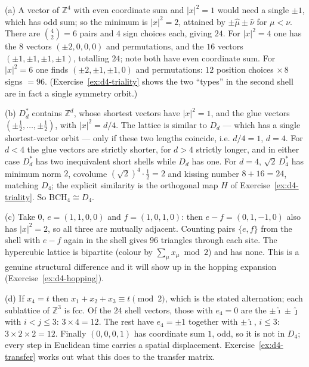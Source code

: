 {(a) A vector of $\mathbb{Z}^4$ with even coordinate sum and $|x|^2=1$ would need
a single $\pm1$, which has odd sum; so the minimum is $|x|^2=2$, attained by
$\pm\hat\mu\pm\hat\nu$ for $\mu<\nu$. There are $\binom42=6$ pairs and $4$ sign
choices each, giving $24$. For $|x|^2=4$ one has the $8$ vectors
$(\pm2,0,0,0)$ and permutations, and the $16$ vectors $(\pm1,\pm1,\pm1,\pm1)$,
totalling $24$; note both have even coordinate sum. For $|x|^2=6$ one finds
$(\pm2,\pm1,\pm1,0)$ and permutations: $12$ position choices $\times\,8$ signs
$=96$. (Exercise~\ref{ex:d4-triality} shows the two ``types'' in the second
shell are in fact a single symmetry orbit.)

(b) $D_d^*$ contains $\mathbb{Z}^d$, whose shortest vectors have $|x|^2=1$, and
the glue vectors $(\pm\tfrac12,\dots,\pm\tfrac12)$, with
$|x|^2 = d/4$. The lattice is similar to $D_d$ --- which has a single
shortest-vector orbit --- only if these two lengths coincide, i.e. $d/4=1$,
$d=4$. For $d<4$ the glue vectors are strictly shorter, for $d>4$ strictly
longer, and in either case $D_d^*$ has two inequivalent short shells while
$D_d$ has one. For $d=4$, $\sqrt{2}\,D_4^*$ has minimum norm $2$, covolume
$(\sqrt2)^4\cdot\tfrac12 = 2$ and kissing number $8+16=24$, matching $D_4$; the
explicit similarity is the orthogonal map $H$ of
Exercise~\ref{ex:d4-triality}. So $\mathrm{BCH}_4 \cong D_4$.

(c) Take $0$, $e=(1,1,0,0)$ and $f=(1,0,1,0)$: then $e-f=(0,1,-1,0)$ also has
$|x|^2=2$, so all three are mutually adjacent. Counting pairs $\{e,f\}$ from
the shell with $e-f$ again in the shell gives $96$ triangles through each site.
The hypercubic lattice is bipartite (colour by $\sum_\mu x_\mu \bmod 2$) and has
none. This is a genuine structural difference and it will show up in the
hopping expansion (Exercise~\ref{ex:d4-hopping}).

(d) If $x_4=t$ then $x_1+x_2+x_3 \equiv t \pmod 2$, which is the stated
alternation; each sublattice of $\mathbb{Z}^3$ is fcc. Of the $24$ shell
vectors, those with $e_4=0$ are the $\pm\hat\imath\pm\hat\jmath$ with
$i<j\le3$: $3\times4=12$. The rest have $e_4=\pm1$ together with
$\pm\hat\imath$, $i\le3$: $3\times2\times2=12$. Finally $(0,0,0,1)$ has
coordinate sum $1$, odd, so it is not in $D_4$; every step in Euclidean time
carries a spatial displacement. Exercise~\ref{ex:d4-transfer} works out what
this does to the transfer matrix.}

